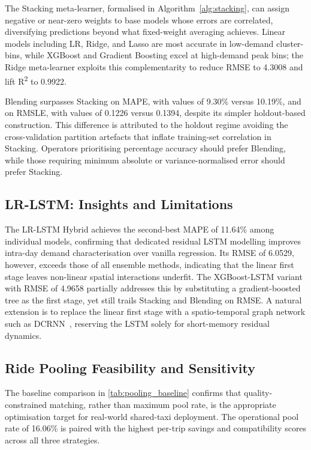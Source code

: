 \documentclass[a4paper,fleqn]{cas-dc}
\begin{document}
The Stacking meta-learner, formalised in Algorithm~\ref{alg:stacking}, can assign negative or near-zero weights to base models whose errors are correlated, diversifying predictions beyond what fixed-weight averaging achieves.  Linear models including LR, Ridge, and Lasso are most accurate in low-demand cluster-bins, while XGBoost and Gradient Boosting excel at high-demand peak bins; the Ridge meta-learner exploits this complementarity to reduce RMSE to 4.3008 and lift R\textsuperscript{2} to 0.9922.

Blending surpasses Stacking on MAPE, with values of 9.30\% versus 10.19\%, and on RMSLE, with values of 0.1226 versus 0.1394, despite its simpler holdout-based construction.  This difference is attributed to the holdout regime avoiding the cross-validation partition artefacts that inflate training-set correlation in Stacking.  Operators prioritising percentage accuracy should prefer Blending, while those requiring minimum absolute or variance-normalised error should prefer Stacking.

\subsection{LR-LSTM: Insights and Limitations}

The LR-LSTM Hybrid achieves the second-best MAPE of 11.64\% among individual models, confirming that dedicated residual LSTM modelling improves intra-day demand characterisation over vanilla regression.  Its RMSE of 6.0529, however, exceeds those of all ensemble methods, indicating that the linear first stage leaves non-linear spatial interactions underfit.  The XGBoost-LSTM variant with RMSE of 4.9658 partially addresses this by substituting a gradient-boosted tree as the first stage, yet still trails Stacking and Blending on RMSE.  A natural extension is to replace the linear first stage with a spatio-temporal graph network such as DCRNN~\cite{li2018diffusion}, reserving the LSTM solely for short-memory residual dynamics.

\subsection{Ride Pooling Feasibility and Sensitivity}

The baseline comparison in \autoref{tab:pooling_baseline} confirms that quality-constrained matching, rather than maximum pool rate, is the appropriate optimisation target for real-world shared-taxi deployment.  The operational pool rate of 16.06\% is paired with the highest per-trip savings and compatibility scores across all three strategies.
\end{document}
